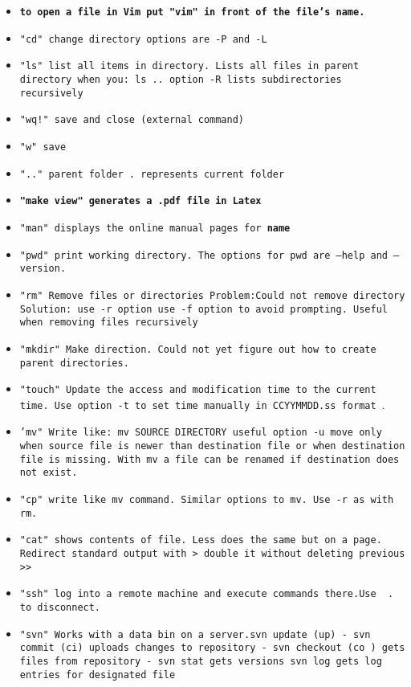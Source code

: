 \documentclass[10pt,a4paper]{scrartcl}
\begin{document}
\begin{itemize}

\item \texttt{\bf to open a file in Vim put "vim" in front of the file's name.}
\item \texttt{"cd" change directory options are -P and -L }
\item \texttt{"ls" list all items in directory. Lists all files in parent directory when you: ls ..
option -R lists subdirectories recursively }
\item \texttt{"wq!" save and close (external command) }
\item \texttt{"w" save}
\item \texttt{".." parent folder . represents current folder}
\item \texttt{\bf "make view" generates a .pdf file in Latex}
\item \texttt{"man" displays the online manual pages for \bf name}
\item \texttt{"pwd" print working directory. The options for pwd are --help and --version.}
\item \texttt{"rm" Remove files or directories Problem:Could not remove directory Solution: use -r option use -f option to avoid prompting. Useful when removing files recursively}
\item \texttt{"mkdir" Make direction.  Could not yet figure out how to create parent directories.}
\item \texttt{"touch" Update the access and modification time to the current time. Use option -t to set time manually in 
CCYYMMDD.ss format }.
\item \texttt{'mv" Write like: mv SOURCE DIRECTORY useful option -u move only when source file is newer than destination file or when destination file is missing. With mv a file can be renamed if destination does not exist. }
\item \texttt{"cp" write like mv command. Similar options to mv. Use -r as with rm. }
\item \texttt{"cat" shows contents of file. Less does the same but on a page. Redirect standard output with > double it without deleting previous >>}
\item \texttt{"ssh" log into a remote machine and execute commands there.Use ~. to disconnect.}
\item \texttt{"svn" Works with a data bin on a server.svn update (up)  - svn commit (ci) uploads changes to repository - svn checkout (co ) gets files from repository - svn stat gets versions svn log gets log entries for designated file}

\end{itemize}
\end{document}
